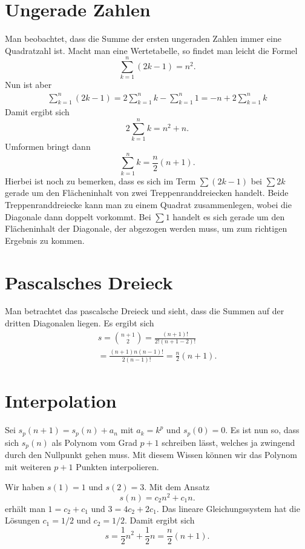 \documentclass[a4paper,10pt,fleqn,twocolumn,twoside]{article}
\begin{document}
\section{Ungerade Zahlen}

Man beobachtet, dass die Summe der ersten ungeraden Zahlen immer
eine Quadratzahl ist. Macht man eine Wertetabelle, so findet man leicht
die Formel
\[\sum_{k=1}^n (2k-1) = n^2.\]
Nun ist aber
\begin{gather*}
\sum_{k=1}^n (2k-1) = 2\sum_{k=1}^n k - \sum_{k=1}^n 1
= -n+2\sum_{k=1}^n k
\end{gather*}
Damit ergibt sich
\[2\sum_{k=1}^n k = n^2+n.\]
Umformen bringt dann
\[\sum_{k=1}^n k = \frac{n}{2}(n+1).\]
Hierbei ist noch zu bemerken, dass es sich im Term \(\sum(2k-1)\) bei
\(\sum 2k\) gerade um den Flächeninhalt von zwei Treppenranddreiecken
handelt. Beide Treppenranddreiecke kann man zu einem Quadrat
zusammenlegen, wobei die Diagonale dann doppelt vorkommt. Bei \(\sum 1\)
handelt es sich gerade um den Flächeninhalt der Diagonale,
der abgezogen werden muss, um zum richtigen Ergebnis zu kommen.


\section{Pascalsches Dreieck}

Man betrachtet das pascalsche Dreieck und sieht, dass
die Summen auf der dritten Diagonalen liegen. Es ergibt sich
\begin{gather*}
s = \binom{n+1}{2} = \frac{(n+1)!}{2!(n+1-2)!}\\
= \frac{(n+1)n(n-1)!}{2(n-1)!} = \frac{n}{2}(n+1).
\end{gather*}


\section{Interpolation}

Sei \(s_p(n+1)=s_p(n)+a_n\) mit \(a_k=k^p\) und \(s_p(0)=0\). Es ist nun so, dass sich \(s_p(n)\) als Polynom vom Grad \(p+1\) schreiben lässt, welches ja zwingend durch den Nullpunkt gehen muss. Mit diesem Wissen können wir das Polynom mit weiteren \(p+1\) Punkten interpolieren.

Wir haben \(s(1)=1\) und \(s(2)=3\). Mit dem Ansatz
\[s(n)=c_2n^2+c_1n.\]
erhält man \(1=c_2+c_1\) und \(3=4c_2+2c_1\). Das lineare
Gleichungssystem hat die Lösungen \(c_1=1/2\) und \(c_2=1/2\).
Damit ergibt sich
\[s=\frac{1}{2}n^2+\frac{1}{2}n = \frac{n}{2}(n+1).\]
\end{document}
